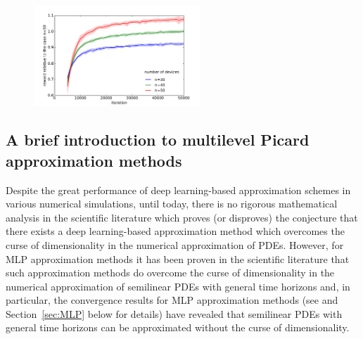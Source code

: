 \documentclass[12pt]{article}
\theoremstyle{definition}
\begin{document}
\begin{figure}[!ht]
\centering
  \includegraphics[width=0.56\textwidth]{./figs/energy_multi_reward}
  \label{fig:energystorage}
\end{figure}


\subsection{A brief introduction to multilevel Picard approximation methods}
\label{sec:intro_MLP}

Despite the great performance of deep learning-based approximation
schemes in various numerical simulations, until today, 
there is no rigorous mathematical analysis in the scientific literature 
which proves (or disproves) 
the conjecture that there exists a deep learning-based approximation method 
which overcomes the curse of dimensionality 
in the numerical approximation of PDEs. 
However, for MLP approximation methods 
it has been proven in the scientific literature 
that such approximation methods do 
overcome the curse of dimensionality in the numerical approximation
of semilinear PDEs with general time horizons 
and, in particular, the convergence results for MLP approximation methods 
(see 
\cite{becker2020arxiv2005,E2016multilevel,Hutzenthaleretal2018arXiv,
hutzenthaler2019arxiv1903,
Becketal2019MLP_nonlip_arXiv,giles2019generalised,
beck2020arxiv2003,
hutzenthaler2019arxiv1912,hutzenthaler2020multilevel,
hutzenthaler2020lipschitz} and Section~\ref{sec:MLP} below for details) 
have revealed that semilinear PDEs with general time horizons 
can be approximated without the curse of dimensionality. 
\end{document}
